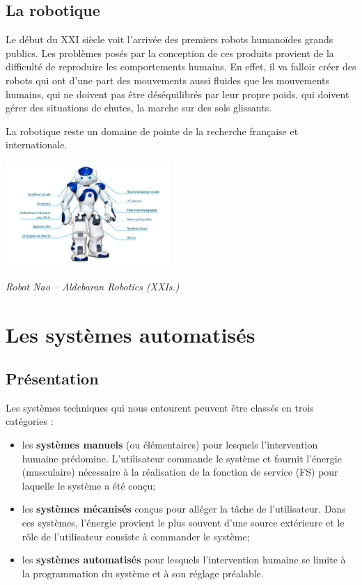 \documentclass[11pt,oneside]{article}
\begin{document}
\subsection{La robotique}
\begin{minipage}[c]{0.5\textwidth}
Le début du XXI \ieme siècle voit l'arrivée des premiers robots humanoïdes grands publics. Les problèmes posés par la conception de ces produits provient de la difficulté de reproduire les comportements humains. En effet, il va falloir créer des robots qui ont d'une part des mouvements aussi fluides que les mouvements humains, qui ne doivent pas être déséquilibrés par leur propre poids, qui doivent gérer des situations de chutes, la marche sur des sols glissants.

La robotique reste un domaine de pointe de la recherche française et internationale.
\end{minipage}\hfill
\begin{minipage}[c]{0.4\textwidth}
 \begin{center}
 \includegraphics[height=4cm]{png/nao2}

\textit{Robot Nao -- Aldebaran Robotics (XXI\ieme s.)}
 \end{center}
\end{minipage}

\section{Les systèmes automatisés}
\subsection{Présentation}


Les systèmes techniques qui nous entourent peuvent être classés en trois
catégories : 
\begin{itemize}
 \item les \textbf{systèmes manuels} (ou élémentaires) pour lesquels l'intervention humaine prédomine. L'utilisateur commande le système et fournit l'énergie (musculaire) nécessaire à la réalisation de la fonction de service (FS) pour laquelle le système a été conçu;
\item les \textbf{systèmes mécanisés} conçus pour alléger la tâche de l'utilisateur. 
Dans ces systèmes, l'énergie provient le plus souvent d'une source extérieure et le rôle de l'utilisateur consiste à commander le système;
\item les \textbf{systèmes automatisés} pour lesquels l'intervention humaine se
limite à la programmation du système et à son réglage préalable.
\end{itemize}
\end{document}
